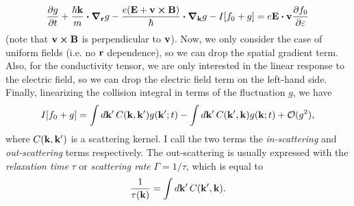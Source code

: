 \documentclass[12pt]{article}
\begin{document}
\begin{equation}
    \pdv{g}{t} + \frac{\hbar\vb{k}}{m}\vdot\grad_{\vb{r}} g
    - \frac{e(\vb{E} + \vb{v}\cross\vb{B})}{\hbar}\vdot\grad_{\vb{k}}g - I[f_0 + g]
    = e\vb{E}\vdot\vb{v}\pdv{f_0}{\varepsilon} \label{eq:boltzmann}
\end{equation}
(note that $\vb{v}\cross\vb{B}$ is perpendicular to $\vb{v}$). Now, we only consider the case of
uniform fields (i.e. no $\vb{r}$ dependence), so we can drop the spatial gradient term. Also, for
the conductivity tensor, we are only interested in the linear response to the electric field, so we
can drop the electric field term on the left-hand side. Finally, linearizing the collision integral
in terms of the fluctuation $g$, we have
\begin{equation}
    I[f_0 + g] = \int\dd{\vb{k'}} C(\vb{k}, \vb{k'}) g(\vb{k'}; t)
    - \int\dd{\vb{k'}} C(\vb{k'}, \vb{k}) g(\vb{k}; t) + \mathcal{O}(g^2),
\end{equation} 
where $C(\vb{k}, \vb{k'})$ is a scattering kernel. I call the two terms the \emph{in-scattering} and
\emph{out-scattering} terms respectively. The out-scattering is usually expressed with the
\emph{relaxation time} $\tau$ or \emph{scattering rate} $\Gamma=1/\tau$, which is equal to
\begin{equation}
    \frac{1}{\tau(\vb{k})} = \int\dd{\vb{k'}} C(\vb{k'}, \vb{k}).
\end{equation}

\end{document}
